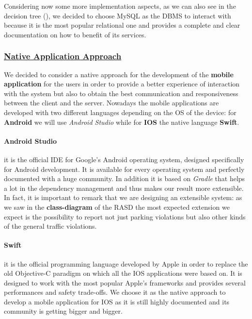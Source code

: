 			Considering now some more implementation aspects, as we can also see in the decision tree (), we decided to choose MySQL as the DBMS to interact with because it is the most popular relational one and provides a complete and clear documentation on how to benefit of its services.
			
		\subsubsection[Native Application Approach]{\hyperlink{toc}{Native Application Approach}}
			\label{sec:nativeAppApproach}
			
			We decided to consider a native approach for the development of the \textbf{mobile application} for the users in order to provide a better experience of interaction with the system but also to obtain the best communication and responsiveness between the client and the server. Nowadays the mobile applications are developed with two different languages depending on the OS of the device: for \textbf{Android} we will use \emph{Android Studio} while for \textbf{IOS} the native language \textbf{Swift}.
			
			\paragraph{Android Studio} it is the official IDE for Google's Android operating system, designed specifically for Android development. It is available for every operating system and perfectly documented with a huge community. In addition it is based on \emph{Gradle} that helps a lot in the dependency management and thus makes our result more extensible. In fact, it is important to remark that we are designing an extensible system: as we saw in the \textbf{class-diagram} of the RASD \cite{RASD} the most expected extension we expect is the possibility to report not just parking violations but also other kinds of the general traffic violations.
			
			\paragraph{Swift} it is the official programming language developed by Apple in order to replace the old Objective-C paradigm on which all the IOS applications were based on. It is designed to work with the most popular Apple's frameworks and provides several performances and safety trade-offs. We choose it as the native approach to develop a mobile application for IOS as it is still highly documented and its community is getting bigger and bigger.